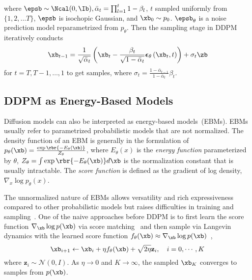 where $\epsb\sim\Ncal(0, \Ib),\bar\alpha_t = \prod_{l=1}^t 1-\beta_l$, $t$ sampled uniformly from $\{1,2,\dots T\}$, $\epsb$ is isochopic Gaussian, and $\xb_0\sim p_0$. $\epsb_\theta$ is a noise prediction model reparametrized from $p_\theta$. 
Then the sampling stage in DDPM iteratively conducts
\begin{equation}
    \xb_{t-1}=\frac{1}{\sqrt{\bar\alpha_t}}\left(\xb_t-\frac{\beta_t}{\sqrt{1-\bar{\alpha}_t}} \boldsymbol{\epsilon}_\theta\left(\xb_t, t\right)\right)+\sigma_t \zb \label{eq:annealed_langevin_2}
\end{equation}
for $t = T, T-1,\dots, 1$ to get samples, where $\sigma_t=\frac{1-\bar\alpha_{t-1}}{1-\bar\alpha_t}\beta_t$.

\subsection{DDPM as Energy-Based Models} 
Diffusion models can also be interpreted as energy-based models~(EBMs).
EBMs usually refer to parametrized probabilistic models that are not normalized. The density function of an EBM is generally in the formulation of
$
p_\theta(\xb) = \frac{\exp\rbr{ - E_\theta(\xb)}}{Z_\theta}
$,
where $E_\theta(x)$ is the \emph{energy function} parameterized by $\theta$, $Z_\theta = \int \exp\rbr{ - E_\theta(\xb)} d \xb$ is the normalization constant that is usually intractable. The \emph{score function} is defined as the gradient of log density, $\nabla_x\log p_\theta(x) $. 

The unnormalized nature of EBMs allows versatility and rich expressiveness compared to other probabilistic models but raises difficulties in training and sampling~\cite{song2021train}. One of the naive approaches before DDPM is to first learn the score function $\nabla_{\xb}\log p(\xb)$ via score matching~\cite{hyvarinen2005estimation,song2020sliced} and then sample via Langevin dynamics with the learned score function $f_\theta(\xb)\approx\nabla_{\xb}\log p(\xb)$~\cite{parisi1981correlation},
\begin{equation}
    \xb_{i+1} \leftarrow \xb_i+\eta f_\theta(\xb)+\sqrt{2 \eta} \mathbf{z}_i, \quad i=0,\cdots, K\label{eq:langevin}
\end{equation}
where $\mathbf{z}_i \sim \mathcal{N}(0, I)$. As $\eta\to 0$ and $K\to\infty$, the sampled $\xb_K$ converges to samples from $p(\xb)$. 

